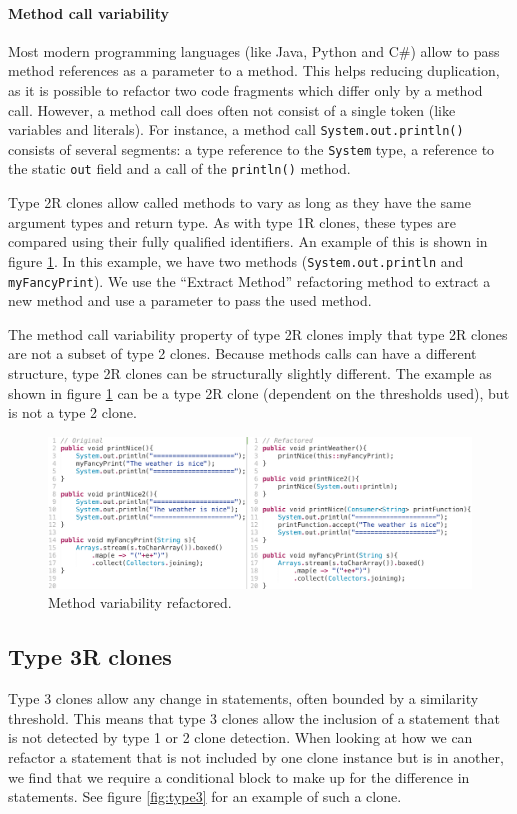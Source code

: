 \paragraph{Method call variability}
Most modern programming languages (like Java, Python and C\#) allow to pass method references as a parameter to a method. This helps reducing duplication, as it is possible to refactor two code fragments which differ only by a method call. However, a method call does often not consist of a single token (like variables and literals). For instance, a method call \texttt{System.out.println()} consists of several segments: a type reference to the \texttt{System} type, a reference to the static \texttt{out} field and a call of the \texttt{println()} method.

Type 2R clones allow called methods to vary as long as they have the same argument types and return type. As with type 1R clones, these types are compared using their fully qualified identifiers. An example of this is shown in figure \ref{fig:type2method}. In this example, we have two methods (\texttt{System.out.println} and \texttt{myFancyPrint}). We use the ``Extract Method'' refactoring method to extract a new method and use a parameter to pass the used method.

The method call variability property of type 2R clones imply that type 2R clones are not a subset of type 2 clones. Because methods calls can have a different structure, type 2R clones can be structurally slightly different. The example as shown in figure \ref{fig:type2method} can be a type 2R clone (dependent on the thresholds used), but is not a type 2 clone.

\begin{figure}[H]
  \centering
  \includegraphics[width=1\columnwidth]{img/type2method}
  \caption{Method variability refactored.}
  \label{fig:type2method}
\end{figure}

\subsection{Type 3R clones}\label{sec:type3r}
Type 3 clones allow any change in statements, often bounded by a similarity threshold. This means that type 3 clones allow the inclusion of a statement that is not detected by type 1 or 2 clone detection. When looking at how we can refactor a statement that is not included by one clone instance but is in another, we find that we require a conditional block to make up for the difference in statements. See figure \ref{fig:type3} for an example of such a clone.

